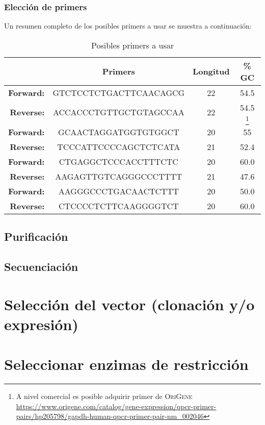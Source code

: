 \documentclass[12pt]{article}
\begin{document}
			\subsubsection{Elecci\'on de primers}		
			Un resumen completo de los posibles primers a usar se muestra a continuaci\'on:
			\begin{table}[h]
				\centering
				\caption{Posibles primers a usar}
				\begin{tabular}{rc|cc}
					\hline
					& \textbf{Primers} & \textbf{Longitud} & \textbf{\% GC} \\
					\hline
					\textbf{Forward:} & \color{Bittersweet}GTCTCCTCTGACTTCAACAGCG & 22 & 54.5 \\
					\textbf{Reverse:} & \color{Bittersweet}ACCACCCTGTTGCTGTAGCCAA & 22 & 54.5 \footnote{A nivel comercial es posible adquirir primer de \textsc{OriGene} \url{https://www.origene.com/catalog/gene-expression/qpcr-primer-pairs/hp205798/gapdh-human-qpcr-primer-pair-nm_002046}}\\
					\hline
					\textbf{Forward:} & \color{green}GCAACTAGGATGGTGTGGCT & 20 & 55 \\
					\textbf{Reverse:} & \color{green}	TCCCATTCCCCAGCTCTCATA & 21 & 52.4 \\
					\hline
					
					\textbf{Forward:} & \color{blue}CTGAGGCTCCCACCTTTCTC & 20 & 60.0 \\
					\textbf{Reverse:} & \color{blue}	AAGAGTTGTCAGGGCCCTTTT & 21 & 47.6 \\
					\hline

					\textbf{Forward:} & \color{red}AAGGGCCCTGACAACTCTTT & 20 & 50.0 \\
					\textbf{Reverse:} & \color{red}	CTCCCCTCTTCAAGGGGTCT & 20 & 60.0 \\
					\hline
				\end{tabular}
			\end{table}
		\subsection{Purificaci\'on}
		\subsection{Secuenciaci\'on}
	\section{Selecci\'on del vector (clonaci\'on y/o expresi\'on)}
	\section{Seleccionar enzimas de restricci\'on}
\end{document}
